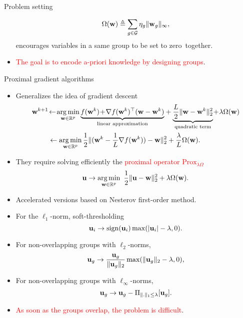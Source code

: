 \documentclass[final]{beamer}
\newcommand{\rred}[1]{{\textcolor{red}{#1}}}
\begin{document}
\begin{frame}{}
\begin{columns}[T]
\begin{column}{0.315\paperwidth}
\begin{block}{Problem setting}
\begin{itemize}
 {\large
\begin{displaymath}
  \Omega({\mathbf w}) \triangleq  \sum_{g \in {\mathcal G}} \eta_g \|{\mathbf w}_g\|_\infty,
\end{displaymath}
}
\hspace*{-0.5cm}encourages variables in a same group to be set to zero~together.
\item \rred{The goal is to encode a-priori knowledge by designing groups}.
\end{itemize}
\end{block}
\begin{block}{Proximal gradient algorithms}
   \begin{itemize}
      \item Generalizes the idea of gradient descent
         \begin{displaymath}
            \begin{split}
               \w^{k+1} & \!\leftarrow \!\argmin_{\w \in \Real^p} {\underbrace{f(\w^k)\! +\! \nabla f(\w^k)^\top(\w-\w^k)}_{\text{linear approximation}}} + {\underbrace{\frac{L}{2}\|\w-\w^k\|_2^2}_{\text{quadratic term}}} \!+\! \lambda\Omega(\w) \\
               & \leftarrow \argmin_{\w \in \Real^p} \frac{1}{2}\|(\w^k - \frac{1}{L}\nabla f(\w^k))-\w\|_2^2 + \frac{\lambda}{L}\Omega(\w). 
            \end{split}
         \end{displaymath}
      \item They require solving efficiently the {\rred{proximal operator $\text{Prox}_{\lambda\Omega}$}}
{\large
         \begin{displaymath}
           \u \to \argmin_{\w \in \Real^p} ~ \frac{1}{2}\|\u-\w\|_2^2 +  \lambda\Omega(\w).
         \end{displaymath}
}
      \item Accelerated versions based on Nesterov first-order method.
      \item For the $\ell_1$-norm, soft-thresholding $${\mathbf u}_i \to  \operatorname{sign}({\mathbf u}_i) \max(|{\mathbf u}_i|-\lambda,0).$$
      \item For non-overlapping groups with $\ell_2$-norms, $${\mathbf u}_g \to \frac{{\mathbf u}_g}{\|{\mathbf u}_g\|_2}\max(\|{\mathbf u}_g\|_2-\lambda,0),$$
      \item For non-overlapping groups with $\ell_\infty$-norms, $${\mathbf u}_g \to {\mathbf u}_g - \Pi_{\|.\|_1 \leq \lambda}[{\mathbf u}_g].$$
      \item \rred{As soon as the groups overlap, the problem is difficult}.
   \end{itemize}
\end{block}



\end{column}
\end{columns}
\end{frame}
\end{document}
